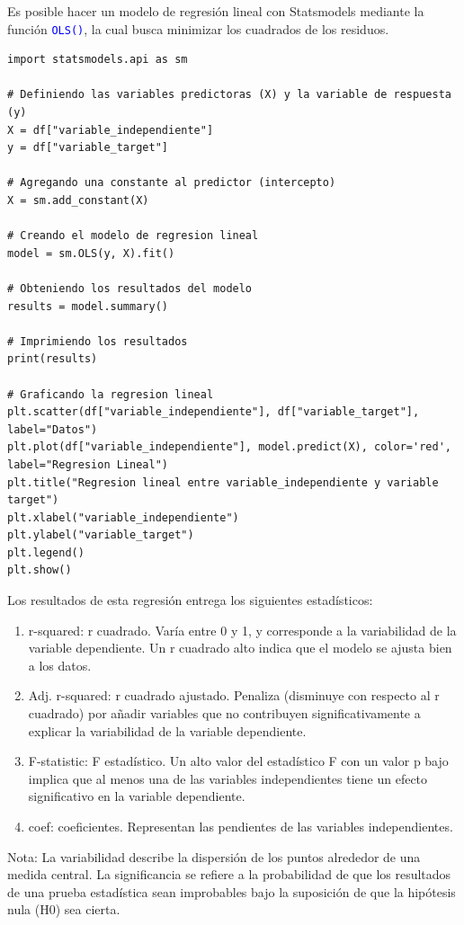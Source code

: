 \documentclass[a4paper, 12pt]{book}
\begin{document}
Es posible hacer un modelo de regresión lineal con Statsmodels mediante la función \texttt{\textcolor{blue}{OLS()}}, la cual busca minimizar los cuadrados de los residuos.
\begin{verbatim}
import statsmodels.api as sm
	
# Definiendo las variables predictoras (X) y la variable de respuesta (y)
X = df["variable_independiente"]
y = df["variable_target"]

# Agregando una constante al predictor (intercepto)
X = sm.add_constant(X)
	
# Creando el modelo de regresion lineal
model = sm.OLS(y, X).fit()
	
# Obteniendo los resultados del modelo
results = model.summary()
	
# Imprimiendo los resultados
print(results)
	
# Graficando la regresion lineal
plt.scatter(df["variable_independiente"], df["variable_target"], label="Datos")
plt.plot(df["variable_independiente"], model.predict(X), color='red', label="Regresion Lineal")
plt.title("Regresion lineal entre variable_independiente y variable target")
plt.xlabel("variable_independiente")
plt.ylabel("variable_target")
plt.legend()
plt.show()
\end{verbatim}
Los resultados de esta regresión entrega los siguientes estadísticos:
\begin{enumerate}
	\item r-squared: r cuadrado. Varía entre 0 y 1, y corresponde a la variabilidad de la variable dependiente. Un r cuadrado alto indica que el modelo se ajusta bien a los datos.
	\item Adj. r-squared: r cuadrado ajustado. Penaliza (disminuye con respecto al r cuadrado) por añadir variables que no contribuyen significativamente a explicar la variabilidad de la variable dependiente.
	\item F-statistic: F estadístico. Un alto valor del estadístico F con un valor p bajo implica que al menos una de las variables independientes tiene un efecto significativo en la variable dependiente.
	\item coef: coeficientes. Representan las pendientes de las variables independientes.
\end{enumerate}
Nota: La variabilidad describe la dispersión de los puntos alrededor de una medida central. La significancia se refiere a la probabilidad de que los resultados de una prueba estadística sean improbables bajo la suposición de que la hipótesis nula (H0) sea cierta.
\end{document}
